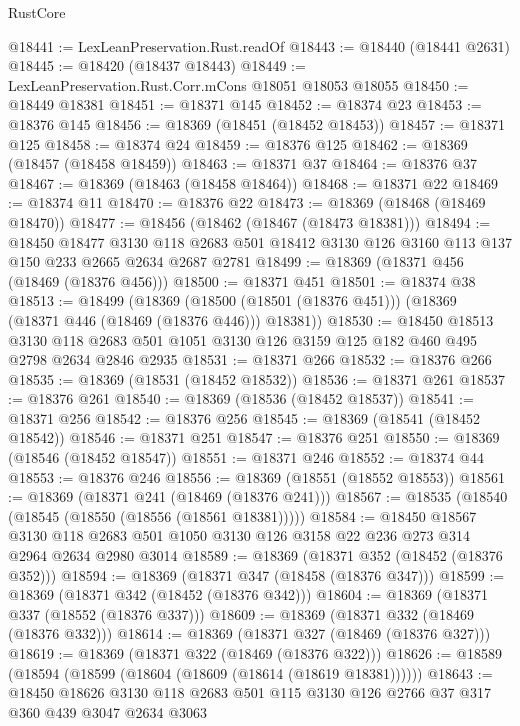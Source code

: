 \begin{lexlean}{RustCore}
\begin{coremodule}
@18441 := LexLeanPreservation.Rust.readOf
@18443 := @18440 (@18441 @2631)
@18445 := @18420 (@18437 @18443)
@18449 := LexLeanPreservation.Rust.Corr.mCons @18051 @18053 @18055
@18450 := @18449 @18381
@18451 := @18371 @145
@18452 := @18374 @23
@18453 := @18376 @145
@18456 := @18369 (@18451 (@18452 @18453))
@18457 := @18371 @125
@18458 := @18374 @24
@18459 := @18376 @125
@18462 := @18369 (@18457 (@18458 @18459))
@18463 := @18371 @37
@18464 := @18376 @37
@18467 := @18369 (@18463 (@18458 @18464))
@18468 := @18371 @22
@18469 := @18374 @11
@18470 := @18376 @22
@18473 := @18369 (@18468 (@18469 @18470))
@18477 := @18456 (@18462 (@18467 (@18473 @18381)))
@18494 := @18450
    @18477
    @3130
    @118
    @2683
    @501
    @18412
    @3130
    @126
    @3160
    @113
    @137
    @150
    @233
    @2665
    @2634
    @2687
    @2781
@18499 := @18369 (@18371 @456 (@18469 (@18376 @456)))
@18500 := @18371 @451
@18501 := @18374 @38
@18513 := @18499
    (@18369 (@18500 (@18501 (@18376 @451))) (@18369 (@18371 @446 (@18469 (@18376 @446))) @18381))
@18530 := @18450
    @18513
    @3130
    @118
    @2683
    @501
    @1051
    @3130
    @126
    @3159
    @125
    @182
    @460
    @495
    @2798
    @2634
    @2846
    @2935
@18531 := @18371 @266
@18532 := @18376 @266
@18535 := @18369 (@18531 (@18452 @18532))
@18536 := @18371 @261
@18537 := @18376 @261
@18540 := @18369 (@18536 (@18452 @18537))
@18541 := @18371 @256
@18542 := @18376 @256
@18545 := @18369 (@18541 (@18452 @18542))
@18546 := @18371 @251
@18547 := @18376 @251
@18550 := @18369 (@18546 (@18452 @18547))
@18551 := @18371 @246
@18552 := @18374 @44
@18553 := @18376 @246
@18556 := @18369 (@18551 (@18552 @18553))
@18561 := @18369 (@18371 @241 (@18469 (@18376 @241)))
@18567 := @18535 (@18540 (@18545 (@18550 (@18556 (@18561 @18381)))))
@18584 := @18450
    @18567
    @3130
    @118
    @2683
    @501
    @1050
    @3130
    @126
    @3158
    @22
    @236
    @273
    @314
    @2964
    @2634
    @2980
    @3014
@18589 := @18369 (@18371 @352 (@18452 (@18376 @352)))
@18594 := @18369 (@18371 @347 (@18458 (@18376 @347)))
@18599 := @18369 (@18371 @342 (@18452 (@18376 @342)))
@18604 := @18369 (@18371 @337 (@18552 (@18376 @337)))
@18609 := @18369 (@18371 @332 (@18469 (@18376 @332)))
@18614 := @18369 (@18371 @327 (@18469 (@18376 @327)))
@18619 := @18369 (@18371 @322 (@18469 (@18376 @322)))
@18626 := @18589 (@18594 (@18599 (@18604 (@18609 (@18614 (@18619 @18381))))))
@18643 := @18450
    @18626
    @3130
    @118
    @2683
    @501
    @115
    @3130
    @126
    @2766
    @37
    @317
    @360
    @439
    @3047
    @2634
    @3063

\end{coremodule}
\end{lexlean}
